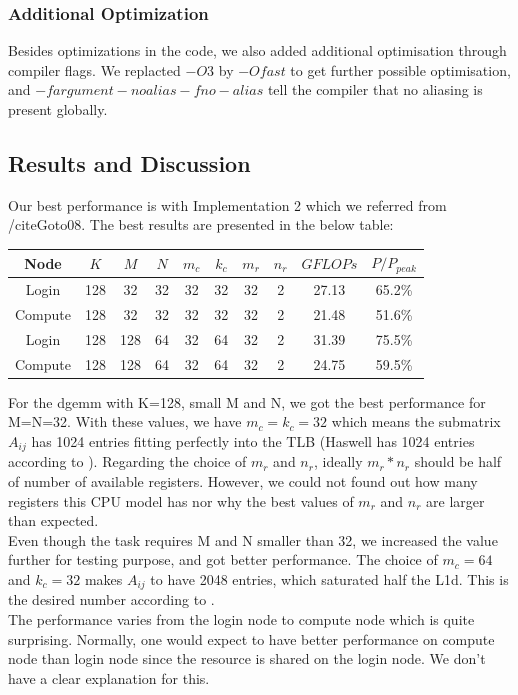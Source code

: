 \documentclass[article]{scrartcl}
\begin{document}
\subsubsection{Additional Optimization}
Besides optimizations in the code, we also added additional optimisation through compiler flags. We replacted $-O3$ by $-Ofast$ to get further possible optimisation, and $-fargument-noalias -fno-alias$ tell the compiler that no aliasing is present globally.

\subsection{Results and Discussion}
Our best performance is with Implementation 2 which we referred from /cite{Goto08}. The best results are presented in the below table:

\begin{center}
	\begin{tabular}{|c |c c c c c c c|c| c| }
		\hline
		Node  & $K$   & $M$ & $N$    & $m_c$ & $k_c$ & $m_r$ & $n_r$ & $GFLOPs$ & $P/P_{peak}$  \\
		\hline
		Login & 128 & 32    & 32   &  32  & 32   & 32   & 2   & 27.13 & 65.2\% \\        
		Compute & 128 & 32    & 32   &  32  & 32   & 32   & 2   & 21.48 & 51.6\% \\        
		Login & 128 & 128    & 64   &  32  & 64   & 32   & 2   & 31.39 & 75.5\% \\         
		Compute & 128 & 128    & 64   &  32  & 64   & 32   & 2   & 24.75  & 59.5\%  \\
		\hline        
	\end{tabular}
\end{center}
For the dgemm with K=128, small M and N, we got the best performance for M=N=32. With these values, we have $m_c = k_c = 32$ which means the submatrix $A_{ij}$ has 1024 entries fitting perfectly into the TLB (Haswell has 1024 entries according to \cite{tlb}). Regarding the choice of $m_r$ and $n_r$, ideally $m_r*n_r$ should be half of number of available registers. However, we could not found out how many registers this CPU model has nor why the best values of $m_r$ and $n_r$ are larger than expected.\\

Even though the task requires M and N smaller than 32, we increased the value further for testing purpose, and got better performance. The choice of $m_c=64$ and $k_c=32$ makes $A_{ij}$ to have 2048 entries, which saturated half the L1d. This is the desired number according to \cite{Goto08}.\\

The performance varies from the login node to compute node which is quite surprising. Normally, one would expect to have better performance on compute node than login node since the resource is shared on the login node. We don't have a clear explanation for this.

\medskip
{}

\end{document}
